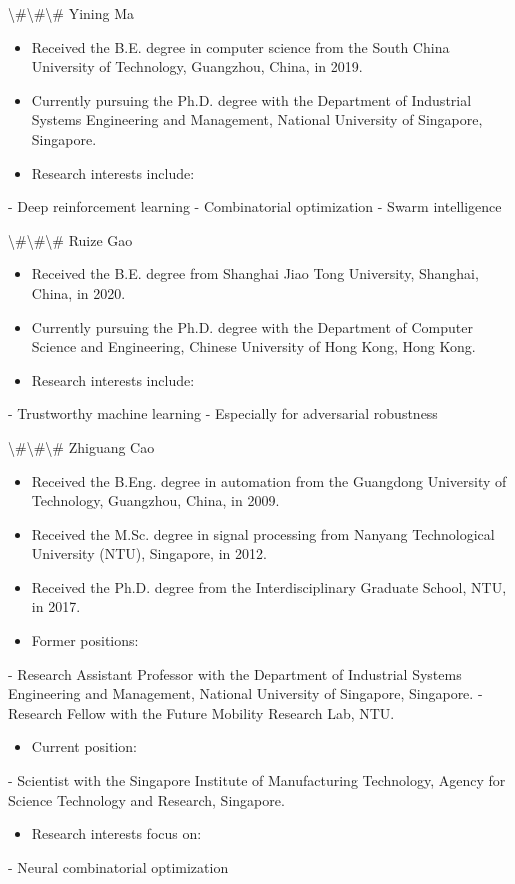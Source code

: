 \documentclass{article}
\begin{document}
	\textbackslash{}#\textbackslash{}#\textbackslash{}# Yining Ma
	
	\begin{itemize}
		\item Received the B.E. degree in computer science from the South China University of Technology, Guangzhou, China, in 2019.
		\item Currently pursuing the Ph.D. degree with the Department of Industrial Systems Engineering and Management, National University of Singapore, Singapore.
		\item Research interests include:
	\end{itemize}
	- Deep reinforcement learning
	- Combinatorial optimization
	- Swarm intelligence
	
	\textbackslash{}#\textbackslash{}#\textbackslash{}# Ruize Gao
	
	\begin{itemize}
		\item Received the B.E. degree from Shanghai Jiao Tong University, Shanghai, China, in 2020.
		\item Currently pursuing the Ph.D. degree with the Department of Computer Science and Engineering, Chinese University of Hong Kong, Hong Kong.
		\item Research interests include:
	\end{itemize}
	- Trustworthy machine learning
	- Especially for adversarial robustness
	
	\textbackslash{}#\textbackslash{}#\textbackslash{}# Zhiguang Cao
	
	\begin{itemize}
		\item Received the B.Eng. degree in automation from the Guangdong University of Technology, Guangzhou, China, in 2009.
		\item Received the M.Sc. degree in signal processing from Nanyang Technological University (NTU), Singapore, in 2012.
		\item Received the Ph.D. degree from the Interdisciplinary Graduate School, NTU, in 2017.
		\item Former positions:
	\end{itemize}
	- Research Assistant Professor with the Department of Industrial Systems Engineering and Management, National University of Singapore, Singapore.
	- Research Fellow with the Future Mobility Research Lab, NTU.
	\begin{itemize}
		\item Current position:
	\end{itemize}
	- Scientist with the Singapore Institute of Manufacturing Technology, Agency for Science Technology and Research, Singapore.
	\begin{itemize}
		\item Research interests focus on:
	\end{itemize}
	- Neural combinatorial optimization
	
\end{document}
